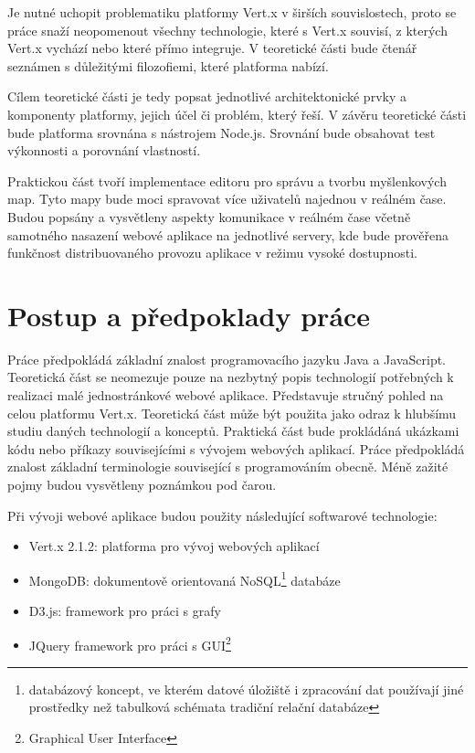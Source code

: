 Je nutné uchopit problematiku platformy Vert.x v širších souvislostech, proto se práce snaží neopomenout všechny technologie, které s Vert.x souvisí, z kterých Vert.x vychází nebo které přímo integruje. V teoretické části bude čtenář seznámen s důležitými filozofiemi, které platforma nabízí. %

Cílem teoretické části je tedy popsat jednotlivé architektonické prvky a komponenty platformy, jejich účel či problém, který řeší. V závěru teoretické části bude platforma srovnána s nástrojem Node.js. Srovnání bude obsahovat test výkonnosti a porovnání vlastností.

Praktickou část tvoří implementace editoru pro správu a tvorbu myšlenkových map. Tyto mapy bude moci spravovat více uživatelů najednou v reálném čase. Budou popsány a vysvětleny aspekty komunikace v reálném čase včetně samotného nasazení webové aplikace na jednotlivé servery, kde bude prověřena funkčnost distribuovaného provozu aplikace v režimu vysoké dostupnosti.

\section{Postup a předpoklady práce}

Práce předpokládá základní znalost programovacího jazyku Java a JavaScript. Teoretická část se neomezuje pouze na nezbytný popis technologií potřebných k realizaci malé jednostránkové webové aplikace. Představuje stručný pohled na celou platformu Vert.x. Teoretická část může být použita jako odraz k hlubšímu studiu daných technologií a konceptů. Praktická část bude prokládáná ukázkami kódu nebo příkazy souvisejícími s vývojem webových aplikací. Práce předpokládá znalost základní terminologie související s programováním obecně. Méně zažité pojmy budou vysvětleny poznámkou pod čarou.

Při vývoji webové aplikace budou použity následující softwarové technologie:
\begin{itemize}
\item Vert.x 2.1.2: platforma pro vývoj webových aplikací
\item MongoDB: dokumentově orientovaná NoSQL\footnote{databázový koncept, ve kterém datové úložiště i zpracování dat používají jiné prostředky než tabulková schémata tradiční relační databáze} databáze
\item D3.js: framework pro práci s grafy
\item JQuery framework pro práci s GUI\footnote{Graphical User Interface}
\end{itemize}